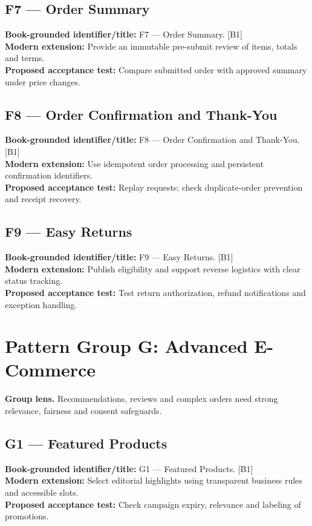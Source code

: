 \documentclass[11pt]{article}
\begin{document}
\subsection{F7 — Order Summary}
\noindent\textcolor{Ocean}{\textbf{Book-grounded identifier/title:}} F7 — Order Summary. [B1]\\
\textcolor{Mint}{\textbf{Modern extension:}} Provide an immutable pre-submit review of items, totals and terms.\\
\textcolor{Amber}{\textbf{Proposed acceptance test:}} Compare submitted order with approved summary under price changes.\medskip
\subsection{F8 — Order Confirmation and Thank-You}
\noindent\textcolor{Ocean}{\textbf{Book-grounded identifier/title:}} F8 — Order Confirmation and Thank-You. [B1]\\
\textcolor{Mint}{\textbf{Modern extension:}} Use idempotent order processing and persistent confirmation identifiers.\\
\textcolor{Amber}{\textbf{Proposed acceptance test:}} Replay requests; check duplicate-order prevention and receipt recovery.\medskip
\subsection{F9 — Easy Returns}
\noindent\textcolor{Ocean}{\textbf{Book-grounded identifier/title:}} F9 — Easy Returns. [B1]\\
\textcolor{Mint}{\textbf{Modern extension:}} Publish eligibility and support reverse logistics with clear status tracking.\\
\textcolor{Amber}{\textbf{Proposed acceptance test:}} Test return authorization, refund notifications and exception handling.\medskip
\section{Pattern Group G: Advanced E-Commerce}

\begin{notebox}\textbf{Group lens.} Recommendations, reviews and complex orders need strong relevance, fairness and consent safeguards.\end{notebox}
\subsection{G1 — Featured Products}
\noindent\textcolor{Ocean}{\textbf{Book-grounded identifier/title:}} G1 — Featured Products. [B1]\\
\textcolor{Mint}{\textbf{Modern extension:}} Select editorial highlights using transparent business rules and accessible slots.\\
\textcolor{Amber}{\textbf{Proposed acceptance test:}} Check campaign expiry, relevance and labeling of promotions.\medskip
\end{document}
